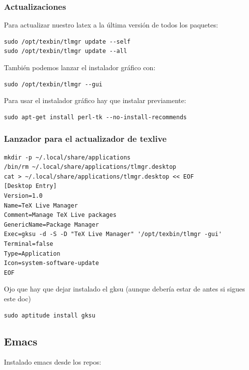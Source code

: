 \documentclass[12pt,spanish,]{article}
\begin{document}
\subsubsection{Actualizaciones}\label{actualizaciones}

Para actualizar nuestro latex a la última versión de todos los paquetes:

\begin{verbatim}
sudo /opt/texbin/tlmgr update --self
sudo /opt/texbin/tlmgr update --all
\end{verbatim}

También podemos lanzar el instalador gráfico con:

\begin{verbatim}
sudo /opt/texbin/tlmgr --gui
\end{verbatim}

Para usar el instalador gráfico hay que instalar previamente:

\begin{verbatim}
sudo apt-get install perl-tk --no-install-recommends
\end{verbatim}

\subsubsection{Lanzador para el actualizador de
texlive}\label{lanzador-para-el-actualizador-de-texlive}

\begin{verbatim}
mkdir -p ~/.local/share/applications
/bin/rm ~/.local/share/applications/tlmgr.desktop
cat > ~/.local/share/applications/tlmgr.desktop << EOF
[Desktop Entry]
Version=1.0
Name=TeX Live Manager
Comment=Manage TeX Live packages
GenericName=Package Manager
Exec=gksu -d -S -D "TeX Live Manager" '/opt/texbin/tlmgr -gui'
Terminal=false
Type=Application
Icon=system-software-update
EOF
\end{verbatim}

Ojo que hay que dejar instalado el gksu (aunque debería estar de antes
si sigues este doc)

\begin{verbatim}
sudo aptitude install gksu
\end{verbatim}

\subsection{Emacs}\label{emacs}

Instalado emacs desde los repos:
\end{document}
